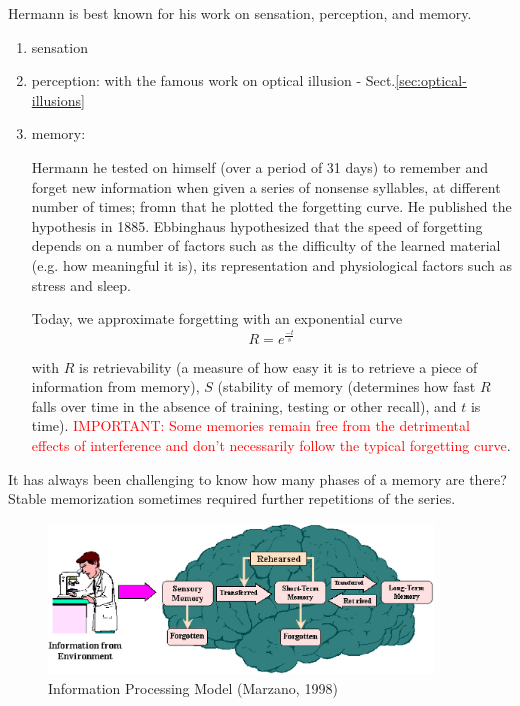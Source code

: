 Hermann is best known for his work on sensation, perception, and memory.
\begin{enumerate}
  \item sensation
  \item perception: with the famous work on optical illusion - Sect.\ref{sec:optical-illusions}
  \item memory: 

Hermann he tested on himself (over a period of 31 days) to remember and forget
new information when given a series of nonsense syllables, at different number
of times; fromn that he plotted the forgetting curve. He published the
hypothesis in 1885.
Ebbinghaus hypothesized that the speed of forgetting depends on a number of
factors such as the difficulty of the learned material (e.g. how meaningful it
is), its representation and physiological factors such as stress and sleep.

Today, we approximate forgetting with an exponential curve
\begin{equation}
R = e^{\frac{-t}{s}}
\end{equation}

with $R$ is retrievability (a measure of how easy it is to retrieve a piece of
information from memory), $S$ (stability of memory (determines how fast $R$
falls over time in the absence of training, testing or other recall), and $t$ is
time).
\textcolor{red}{IMPORTANT: Some memories remain free from the detrimental
effects of interference and don’t necessarily follow the typical forgetting
curve}.

\end{enumerate}
It has always been
challenging to know how many phases of a memory are there? Stable memorization
sometimes required further repetitions of the series.


\begin{figure}[hbt]
  \centerline{\includegraphics[height=4cm,
    angle=0]{./images/brain_store_information.eps}}
\caption{Information Processing Model (Marzano, 1998)}
\label{fig:brain_store_information}
\end{figure}

